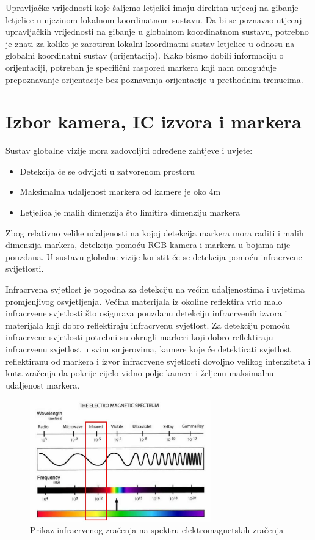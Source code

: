 \documentclass[times, utf8, diplomski]{fer}
\begin{document}
Upravljačke vrijednosti koje šaljemo letjelici imaju direktan utjecaj na gibanje letjelice u njezinom lokalnom koordinatnom sustavu. Da bi se poznavao utjecaj upravljačkih vrijednosti na gibanje u globalnom koordinatnom sustavu, potrebno je znati za koliko je zarotiran lokalni koordinatni sustav letjelice u odnosu na globalni koordinatni sustav (orijentacija). Kako bismo dobili informaciju o orijentaciji, potreban je specifični raspored markera koji nam omogućuje prepoznavanje orijentacije bez poznavanja orijentacije u prethodnim trenucima.

\section{Izbor kamera, IC izvora i markera}
Sustav globalne vizije mora zadovoljiti određene zahtjeve i uvjete:
\begin{itemize}
	\item Detekcija će se odvijati u zatvorenom prostoru
	\item Maksimalna udaljenost markera od kamere je oko 4m
	\item Letjelica je malih dimenzija što limitira dimenziju markera 
\end{itemize}
Zbog relativno velike udaljenosti na kojoj detekcija markera mora raditi i malih dimenzija markera, detekcija pomoću RGB kamera i markera u bojama nije pouzdana. U sustavu globalne vizije koristit će se detekcija pomoću infracrvene svijetlosti.

Infracrvena svjetlost je pogodna za detekciju na većim udaljenostima i uvjetima promjenjivog osvjetljenja. Većina materijala iz okoline reflektira vrlo malo infracrvene svjetlosti što osigurava pouzdanu detekciju infracrvenih izvora i materijala koji dobro reflektiraju infracrvenu svjetlost. Za detekciju pomoću infracrvene svjetlosti potrebni su okrugli markeri koji dobro reflektiraju infracrvenu svjetlost u svim smjerovima, kamere koje će detektirati svjetlost reflektiranu od markera i izvor infracrvene svjetlosti dovoljno velikog intenziteta i kuta zračenja da pokrije cijelo vidno polje kamere i željenu maksimalnu udaljenost markera.

\begin{figure}[h]
\centering
\includegraphics[width=0.7\textwidth]{infrared}
\caption{Prikaz infracrvenog zračenja na spektru elektromagnetskih zračenja \protect\footnotemark}
\end{figure}
\end{document}
